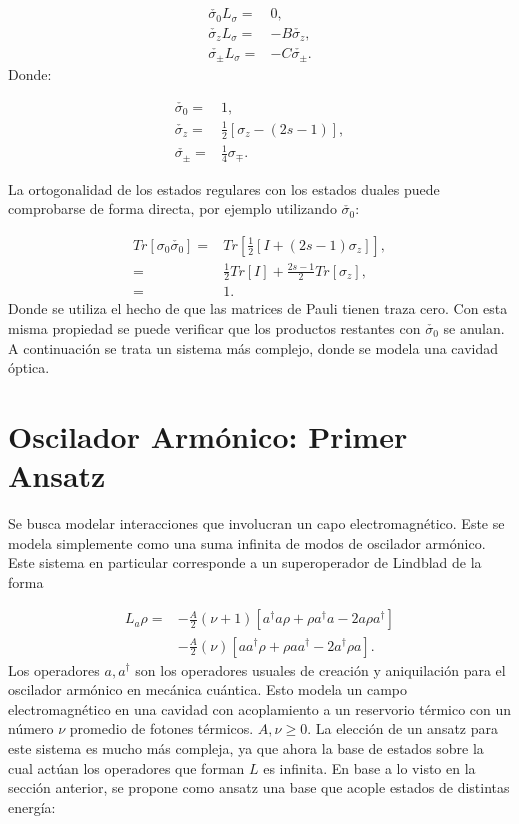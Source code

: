 \documentclass[a4paper,10pt]{report}
\begin{document}
\begin{align}
\check{\sigma_0} L_\sigma  =& 0, \\
\check{\sigma_z} L_\sigma =& -B \check{\sigma_z}, \\
\check{\sigma_{\pm}} L_\sigma =& -C \check{\sigma_{\pm}}.
\end{align} Donde:

\begin{align*}
\check{\sigma_0} =& 1,\\
\check{\sigma_z} =& \frac{1}{2}[\sigma_z-(2s-1)],\\
\check{\sigma_{\pm}} =& \frac{1}{4}\sigma_{\mp}.
\end{align*}

La ortogonalidad de los estados regulares con los estados duales puede comprobarse de forma directa, por ejemplo utilizando $\check{\sigma_0}$:

\begin{align*}
Tr[\sigma_0\check{\sigma_0}] =& Tr[\frac{1}{2}[I + (2s-1)\sigma_z]],\\
=& \frac{1}{2} Tr[I] + \frac{2s-1}{2}Tr[\sigma_z],\\
=& 1.
\end{align*} Donde se utiliza el hecho de que las matrices de Pauli tienen traza cero. Con esta misma propiedad se puede verificar que los productos restantes con $\check{\sigma_0}$ se anulan. A continuación se trata un sistema más complejo, donde se modela una cavidad óptica.

\section{Oscilador Armónico: Primer Ansatz}

Se busca modelar interacciones que involucran un capo electromagnético. Este se modela simplemente como una suma infinita de modos de oscilador armónico. Este sistema en particular corresponde a un superoperador de Lindblad de la forma \cite{EnglertDB}

\begin{align}\label{EMField}
L_a \rho =& - \frac{A}{2}(\nu + 1)[a^\dagger a\rho + \rho a^\dagger a -2a\rho a^\dagger] \nonumber \\
 &- \frac{A}{2}(\nu)[ aa^\dagger\rho + \rho  aa^\dagger -2a^\dagger\rho a].
\end{align}Los operadores $a,a^{\dagger}$ son los operadores usuales de creación y aniquilación para el oscilador armónico en mecánica cuántica. Esto modela un campo electromagnético en una cavidad con acoplamiento a un reservorio térmico con un número $\nu$ promedio de fotones térmicos. $A,\nu \geq 0$. La elección de un ansatz para este sistema es mucho más compleja, ya que ahora la base de estados sobre la cual actúan los operadores que forman $L$ es infinita.  En base a lo visto en la sección anterior, se propone como ansatz una base que acople estados de distintas energía:
\end{document}
